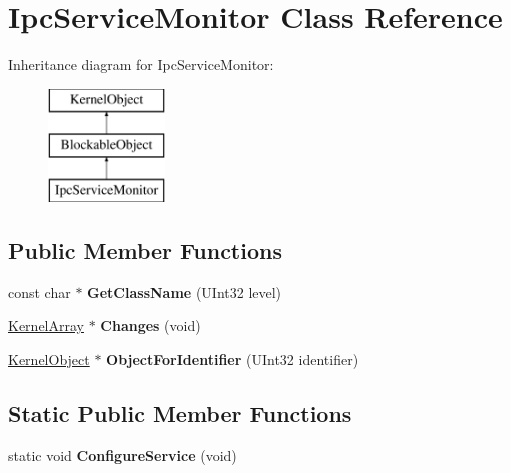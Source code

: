 \hypertarget{class_ipc_service_monitor}{}\section{Ipc\+Service\+Monitor Class Reference}
\label{class_ipc_service_monitor}
Inheritance diagram for Ipc\+Service\+Monitor\+:\begin{figure}[H]
\begin{center}
\leavevmode
\includegraphics[height=3.000000cm]{class_ipc_service_monitor}
\end{center}
\end{figure}
\subsection*{Public Member Functions}
\begin{DoxyCompactItemize}
\item 
\mbox{\label{class_ipc_service_monitor_aaca1a440a5511502271fa484c42daaad}} 
const char $\ast$ {\bfseries Get\+Class\+Name} (U\+Int32 level)
\item 
\mbox{\label{class_ipc_service_monitor_a2dd053de1d4c38a92ebf016790a195ec}} 
\hyperlink{class_kernel_array}{Kernel\+Array} $\ast$ {\bfseries Changes} (void)
\item 
\mbox{\label{class_ipc_service_monitor_ae652890e03e40cde39b03e077c120122}} 
\hyperlink{class_kernel_object}{Kernel\+Object} $\ast$ {\bfseries Object\+For\+Identifier} (U\+Int32 identifier)
\end{DoxyCompactItemize}
\subsection*{Static Public Member Functions}
\begin{DoxyCompactItemize}
\item 
\mbox{\label{class_ipc_service_monitor_a220c12df2ae7643d77849bd2f4355739}} 
static void {\bfseries Configure\+Service} (void)
\end{DoxyCompactItemize}

